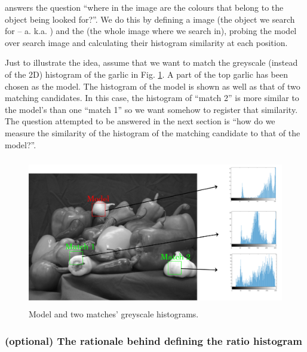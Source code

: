 \documentclass[a4paper]{article}
\begin{document}

 answers the question ``where in the image are the colours that belong to the object being looked for?''. We do this by defining a  image (the object we search for -- a. k.a. ) and the  (the whole image where we search in), probing the model over search image and calculating their histogram  similarity at each position.

Just to illustrate the idea, assume that we want to match the greyscale (instead of the 2D) histogram of the garlic in Fig. \ref{fig:peppers_and_garlic}. A part of the top garlic has been chosen as the model. The histogram of the model is shown as well as that of two matching candidates. In this case, the histogram of ``match 2'' is more similar to the model's than one ``match 1'' so we want somehow to register that similarity. The question attempted to be answered in the next section is ``how do we measure the similarity of the histogram of the matching candidate to that of the model?''.
\begin{figure}[H]
    \centering
    \includegraphics[height=6.5cm]{img/image_hist_different_regions.png}
    \caption{Model and two matches' greyscale histograms.}
    \label{fig:peppers_and_garlic}
\end{figure}


\subsubsection{(optional) The rationale behind defining the ratio histogram}
\end{document}
